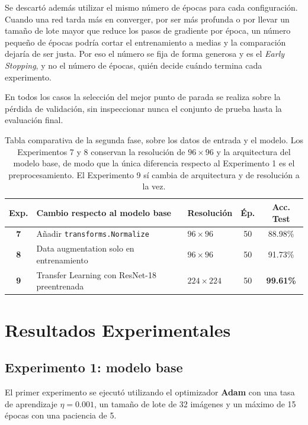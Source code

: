 \documentclass[11pt, a4paper]{article}
\begin{document}
Se descartó además utilizar el mismo número de épocas para cada configuración. Cuando una red tarda más en converger, por ser más profunda o por llevar un tamaño de lote mayor que reduce los pasos de gradiente por época, un número pequeño de épocas podría cortar el entrenamiento a medias y la comparación dejaría de ser justa. Por eso el número se fija de forma generosa y es el \textit{Early Stopping}, y no el número de épocas, quién decide cuándo termina cada experimento. 

En todos los casos la selección del mejor punto de parada se realiza sobre la pérdida de validación, sin inspeccionar nunca el conjunto de prueba hasta la evaluación final.

\begin{table}[H]
\centering
\footnotesize
\caption{Tabla comparativa de la segunda fase, sobre los datos de entrada y el modelo. Los Experimentos 7 y 8 conservan la resolución de $96 \times 96$ y la arquitectura del modelo base, de modo que la única diferencia respecto al Experimento 1 es el preprocesamiento. El Experimento 9 sí cambia de arquitectura y de resolución a la vez.}
\label{tab:experimentos_datos}
\setlength{\tabcolsep}{3pt}
\begin{tabularx}{\linewidth}{c X X c c}
\toprule
\textbf{Exp.} & \textbf{Cambio respecto al modelo base} & \textbf{Resolución} & \textbf{Ép.} & \textbf{Acc. Test} \\
\midrule
\textbf{7} & Añadir \texttt{transforms.Normalize} & $96 \times 96$ & 50 & 88.98\% \\
\textbf{8} & Data augmentation solo en entrenamiento & $96 \times 96$ & 50 & 91.73\% \\
\textbf{9} & Transfer Learning con ResNet-18 preentrenada & $224 \times 224$ & 50 & \textbf{99.61\%} \\
\bottomrule
\end{tabularx}
\setlength{\tabcolsep}{6pt}
\end{table}

\section{Resultados Experimentales}

\subsection{Experimento 1: modelo base}
El primer experimento se ejecutó utilizando el optimizador \textbf{Adam} con una tasa de aprendizaje $\eta = 0.001$, un tamaño de lote de 32 imágenes y un máximo de 15 épocas con una paciencia de 5.
\end{document}
